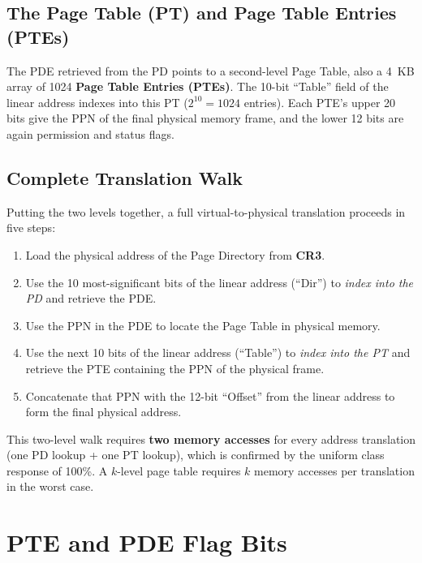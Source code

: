 \documentclass[11pt]{article}
\begin{document}
\subsection{The Page Table (PT) and Page Table Entries (PTEs)}

The PDE retrieved from the PD points to a second-level Page Table, also a 4~KB array of 1024 \textbf{Page Table Entries (PTEs)}. The 10-bit ``Table'' field of the linear address indexes into this PT ($2^{10} = 1024$ entries). Each PTE's upper 20 bits give the PPN of the final physical memory frame, and the lower 12 bits are again permission and status flags.

\subsection{Complete Translation Walk}

Putting the two levels together, a full virtual-to-physical translation proceeds in five steps:

\begin{enumerate}
    \item Load the physical address of the Page Directory from \textbf{CR3}.
    \item Use the 10 most-significant bits of the linear address (``Dir'') to \emph{index into the PD} and retrieve the PDE.
    \item Use the PPN in the PDE to locate the Page Table in physical memory.
    \item Use the next 10 bits of the linear address (``Table'') to \emph{index into the PT} and retrieve the PTE containing the PPN of the physical frame.
    \item Concatenate that PPN with the 12-bit ``Offset'' from the linear address to form the final physical address.
\end{enumerate}

This two-level walk requires \textbf{two memory accesses} for every address translation (one PD lookup + one PT lookup), which is confirmed by the uniform class response of 100\%. A $k$-level page table requires $k$ memory accesses per translation in the worst case.

\section{PTE and PDE Flag Bits}
\end{document}
